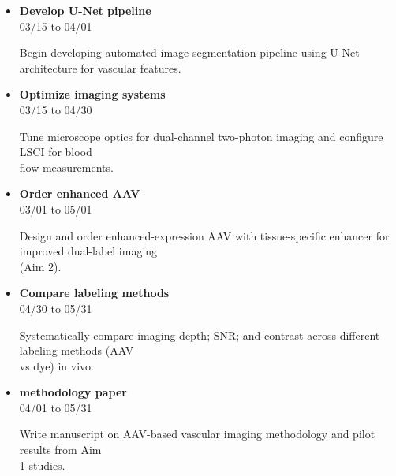 \documentclass[landscape,a4paper]{article}
\begin{document}
\begin{itemize}[leftmargin=1cm, itemsep=0.8em]
    \item \textcolor{other}{\textbf{Develop U-Net pipeline}}\\[0.2em]
          \textcolor{black!70}{\small 03/15 to 04/01}
\\[0.3em]
          \begin{minipage}[t]{0.85\textwidth}
          \textcolor{black!80}{Begin developing automated image segmentation pipeline using U-Net architecture for vascular features.}
          \end{minipage}

    \item \textcolor{other}{\textbf{Optimize imaging systems}}\\[0.2em]
          \textcolor{black!70}{\small 03/15 to 04/30}
\\[0.3em]
          \begin{minipage}[t]{0.85\textwidth}
          \textcolor{black!80}{Tune microscope optics for dual-channel two-photon imaging and configure LSCI for blood\\[0.1em]
          flow measurements.}
          \end{minipage}

    \item \textcolor{other}{\textbf{Order enhanced AAV}}\\[0.2em]
          \textcolor{black!70}{\small 03/01 to 05/01}
\\[0.3em]
          \begin{minipage}[t]{0.85\textwidth}
          \textcolor{black!80}{Design and order enhanced-expression AAV with tissue-specific enhancer for improved dual-label imaging\\[0.1em]
          (Aim 2).}
          \end{minipage}

    \item \textcolor{other}{\textbf{Compare labeling methods}}\\[0.2em]
          \textcolor{black!70}{\small 04/30 to 05/31}
\\[0.3em]
          \begin{minipage}[t]{0.85\textwidth}
          \textcolor{black!80}{Systematically compare imaging depth; SNR; and contrast across different labeling methods (AAV\\[0.1em]
          vs dye) in vivo.}
          \end{minipage}

    \item \textcolor{researchout}{\textbf{methodology paper}}\\[0.2em]
          \textcolor{black!70}{\small 04/01 to 05/31}
\\[0.3em]
          \begin{minipage}[t]{0.85\textwidth}
          \textcolor{black!80}{Write manuscript on AAV-based vascular imaging methodology and pilot results from Aim\\[0.1em]
          1 studies.}
          \end{minipage}

\end{itemize}
\end{document}
